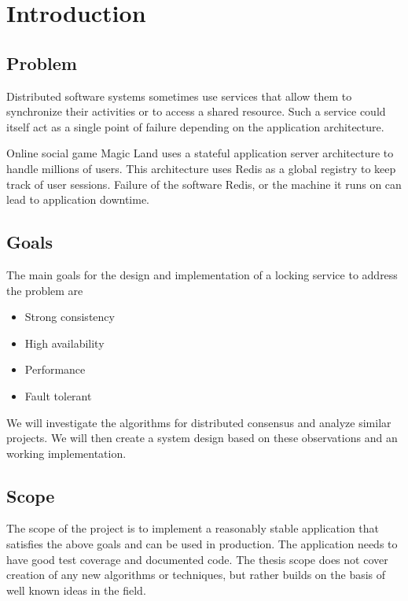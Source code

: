 \chapter{Introduction}
\label{chapter:introduction}

\section{Problem}

Distributed software systems sometimes use services that allow them to 
synchronize their activities or to access a shared resource. Such a
service could itself act as a single point of failure depending on the
application architecture.

Online social game Magic Land uses a stateful application server architecture to
handle millions of users. This architecture uses Redis as a global registry to
keep track of user sessions. Failure of the software Redis, or the machine it
runs on can lead to application downtime.

\section{Goals}

The main goals for the design and implementation of a locking service to address
the problem are

\begin{itemize}
  \item Strong consistency
  \item High availability
  \item Performance
  \item Fault tolerant
\end{itemize}

We will investigate the algorithms for distributed consensus and analyze similar
projects. We will then create a system design based on these observations and
an working implementation.

\section{Scope}

The scope of the project is to implement a reasonably stable application that
satisfies the above goals and can be used in production. The application needs
to have good test coverage and documented code. The thesis scope does not cover
creation of any new algorithms or techniques, but rather builds on the basis of
well known ideas in the field.


